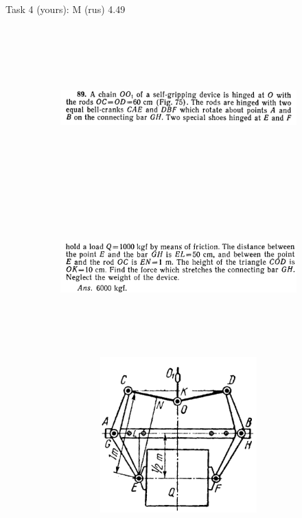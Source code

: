 \documentclass[aspectratio=169]{beamer}
\newcommand{\fbckg}[1]{\usebackgroundtemplate{\texttt{[image: \#1]}}}%
\begin{document}
\begin{frame}[t]{Task 4 (yours): M (rus) 4.49
    }
\framesubtitle{}
    \begin{figure}[H]
        \begin{subfigure}{0.69\textwidth}
            \centering\includegraphics[height=6cm,width=1\textwidth,keepaspectratio]{image19.png}
            \label{fig:image19}
            \centering\includegraphics[height=6cm,width=1\textwidth,keepaspectratio]{image18.png}
            \label{fig:image18}
        \end{subfigure}
        \begin{subfigure}{0.29\textwidth}
            \centering\includegraphics[height=6cm,width=1\textwidth,keepaspectratio]{image20.png}
            \label{fig:image20}
        \end{subfigure}
    
    \label{fig:}
    \end{figure}
\end{frame}

\fbckg{fibeamer/figs/last_page.png}
\frame[plain]{}
\end{document}

